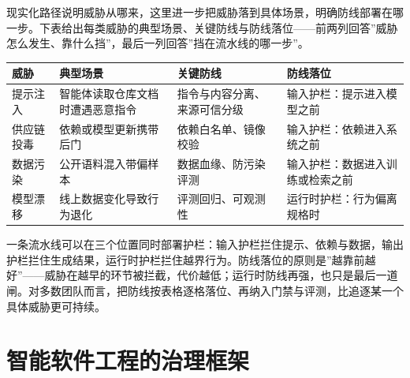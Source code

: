 \documentclass[12pt,a4paper,twoside,openany]{ctexbook}
\numberwithin{figure}{chapter}
\numberwithin{table}{chapter}
\newcounter{none}
\begin{document}
现实化路径说明威胁从哪来，这里进一步把威胁落到具体场景，明确防线部署在哪一步。下表给出每类威胁的典型场景、关键防线与防线落位------前两列回答''威胁怎么发生、靠什么挡''，最后一列回答''挡在流水线的哪一步''。

{\def\LTcaptype{none} %
\begin{longtable}[]{@{}
  >{\raggedright\arraybackslash}p{}
  >{\raggedright\arraybackslash}p{}
  >{\raggedright\arraybackslash}p{}
  >{\raggedright\arraybackslash}p{}@{}}
\toprule\noalign{}
\begin{minipage}[b]{\linewidth}\raggedright
威胁
\end{minipage} & \begin{minipage}[b]{\linewidth}\raggedright
典型场景
\end{minipage} & \begin{minipage}[b]{\linewidth}\raggedright
关键防线
\end{minipage} & \begin{minipage}[b]{\linewidth}\raggedright
防线落位
\end{minipage} \\
\midrule\noalign{}
\endhead
\bottomrule\noalign{}
\endlastfoot
提示注入 & 智能体读取仓库文档时遭遇恶意指令 &
指令与内容分离、来源可信分级 & 输入护栏：提示进入模型之前 \\
供应链投毒 & 依赖或模型更新携带后门 & 依赖白名单、镜像校验 &
输入护栏：依赖进入系统之前 \\
数据污染 & 公开语料混入带偏样本 & 数据血缘、防污染评测 &
输入护栏：数据进入训练或检索之前 \\
模型漂移 & 线上数据变化导致行为退化 & 评测回归、可观测性 &
运行时护栏：行为偏离规格时 \\
\end{longtable}
}

一条流水线可以在三个位置同时部署护栏：输入护栏拦住提示、依赖与数据，输出护栏拦住生成结果，运行时护栏拦住越界行为。防线落位的原则是''越靠前越好''------威胁在越早的环节被拦截，代价越低；运行时防线再强，也只是最后一道闸。对多数团队而言，把防线按表格逐格落位、再纳入门禁与评测，比追逐某一个具体威胁更可持续。

\section{智能软件工程的治理框架}\label{ux667aux80fdux8f6fux4ef6ux5de5ux7a0bux7684ux6cbbux7406ux6846ux67b6}
\end{document}
